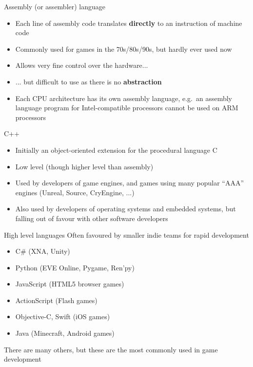 \begin{frame}{Assembly (or assembler) language}
	\begin{itemize}
		\pause\item Each line of assembly code translates \textbf{directly} to an instruction of machine code
		\pause\item Commonly used for games in the 70s/80s/90s, but hardly ever used now
		\pause\item Allows very fine control over the hardware...
		\pause\item ... but difficult to use as there is no \textbf{abstraction}
		\pause\item Each CPU architecture has its own assembly language,
			e.g.\ an assembly language program for Intel-compatible processors cannot be
			used on ARM processors
	\end{itemize}
\end{frame}

\begin{frame}{C++}
	\begin{itemize}
		\pause\item Initially an object-oriented extension for the procedural language C
		\pause\item Low level (though higher level than assembly)
		\pause\item Used by developers of game engines,
			and games using many popular ``AAA'' engines (Unreal, Source, CryEngine, ...)
		\pause\item Also used by developers of operating systems and embedded systems,
			but falling out of favour with other software developers
	\end{itemize}
\end{frame}

\begin{frame}{High level languages}
	\pause Often favoured by smaller indie teams for rapid development
	\begin{itemize}
		\pause\item C\# (XNA, Unity)
		\pause\item Python (EVE Online, Pygame, Ren'py)
		\pause\item JavaScript (HTML5 browser games)
		\pause\item ActionScript (Flash games)
		\pause\item Objective-C, Swift (iOS games)
		\pause\item Java (Minecraft, Android games)
	\end{itemize}
	\pause There are many others, but these are the most commonly used in game development
\end{frame}

